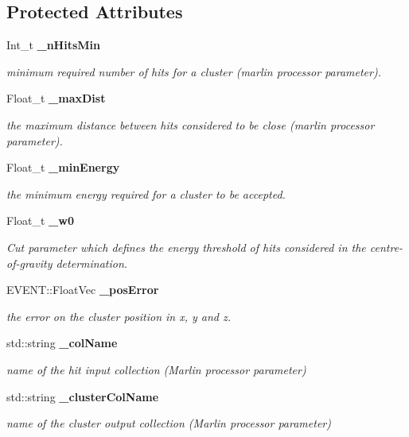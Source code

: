 \subsection*{Protected Attributes}
\begin{DoxyCompactItemize}
\item 
Int\_\-t {\bf \_\-nHitsMin}
\begin{DoxyCompactList}\small\item\em minimum required number of hits for a cluster (marlin processor parameter). \item\end{DoxyCompactList}\item 
Float\_\-t {\bf \_\-maxDist}
\begin{DoxyCompactList}\small\item\em the maximum distance between hits considered to be close (marlin processor parameter). \item\end{DoxyCompactList}\item 
Float\_\-t {\bf \_\-minEnergy}
\begin{DoxyCompactList}\small\item\em the minimum energy required for a cluster to be accepted. \item\end{DoxyCompactList}\item 
Float\_\-t {\bf \_\-w0}
\begin{DoxyCompactList}\small\item\em Cut parameter which defines the energy threshold of hits considered in the centre-\/of-\/gravity determination. \item\end{DoxyCompactList}\item 
EVENT::FloatVec {\bf \_\-posError}
\begin{DoxyCompactList}\small\item\em the error on the cluster position in x, y and z. \item\end{DoxyCompactList}\item 
std::string {\bf \_\-colName}\label{classCALICE_1_1Clusteriser_af6a7832cc276de50a9c96649b5b27bc3}

\begin{DoxyCompactList}\small\item\em name of the hit input collection (Marlin processor parameter) \item\end{DoxyCompactList}\item 
std::string {\bf \_\-clusterColName}\label{classCALICE_1_1Clusteriser_a2eda1746e521ba46d07556aabdfbfb6b}

\begin{DoxyCompactList}\small\item\em name of the cluster output collection (Marlin processor parameter) \item\end{DoxyCompactList}\end{DoxyCompactItemize}
